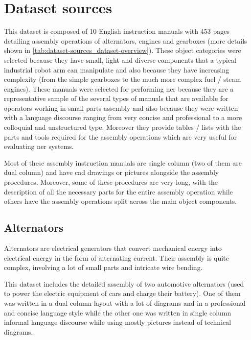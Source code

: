 \section{Dataset sources}\label{sec:dataset-sources}

This dataset is composed of 10 English instruction manuals with 453 pages detailing assembly operations of alternators, engines and gearboxes (more details shown in \cref{tab:dataset-sources_dataset-overview}). These object categories were selected because they have small, light and diverse components that a typical industrial robot arm can manipulate and also because they have increasing complexity (from the simple gearboxes to the much more complex fuel / steam engines). These manuals were selected for performing \gls{ner} because they are a representative sample of the several types of manuals that are available for operators working in small parts assembly and also because they were written with a language discourse ranging from very concise and professional to a more colloquial and unstructured type. Moreover they provide tables / lists with the parts and tools required for the assembly operations which are very useful for evaluating \gls{ner} systems.

Most of these assembly instruction manuals are single column (two of them are dual column) and have \gls{cad} drawings or pictures alongside the assembly procedures. Moreover, some of these procedures are very long, with the description of all the necessary parts for the entire assembly operation while others have the assembly operations split across the main object components.


\subsection{Alternators}

Alternators are electrical generators that convert mechanical energy into electrical energy in the form of alternating current. Their assembly is quite complex, involving a lot of small parts and intricate wire bending.

This dataset includes the detailed assembly of two automotive alternators (used to power the electric equipment of cars and charge their battery). One of them was written in a dual column layout with a lot of diagrams and in a professional and concise language style while the other one was written in single column informal language discourse while using mostly pictures instead of technical diagrams.


